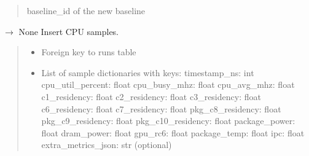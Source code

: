 \documentclass[letterpaper,10pt,english]{sphinxmanual}
\begin{document}
\begin{fulllineitems}
\begin{fulllineitems}
\begin{quote}
\begin{description}
\sphinxAtStartPar
baseline\_id of the new baseline

\end{description}\end{quote}

\end{fulllineitems}


\begin{fulllineitems}
\label{\detokenize{core.database.base:core.database.base.DatabaseInterface.insert_cpu_samples}}
\pysigstartsignatures
\pysiglinewithargsret
{}
{\sphinxparamcomma {}}
{{ $\rightarrow$ None}}
\pysigstopsignatures
\sphinxAtStartPar
Insert CPU samples.
\begin{quote}\begin{description}
\begin{itemize}
\item {} 
\sphinxAtStartPar
{} \textendash{} Foreign key to runs table

\item {} 
\sphinxAtStartPar
{} \textendash{} List of sample dictionaries with keys:
\sphinxhyphen{} timestamp\_ns: int
\sphinxhyphen{} cpu\_util\_percent: float
\sphinxhyphen{} cpu\_busy\_mhz: float
\sphinxhyphen{} cpu\_avg\_mhz: float
\sphinxhyphen{} c1\_residency: float
\sphinxhyphen{} c2\_residency: float
\sphinxhyphen{} c3\_residency: float
\sphinxhyphen{} c6\_residency: float
\sphinxhyphen{} c7\_residency: float
\sphinxhyphen{} pkg\_c8\_residency: float
\sphinxhyphen{} pkg\_c9\_residency: float
\sphinxhyphen{} pkg\_c10\_residency: float
\sphinxhyphen{} package\_power: float
\sphinxhyphen{} dram\_power: float
\sphinxhyphen{} gpu\_rc6: float
\sphinxhyphen{} package\_temp: float
\sphinxhyphen{} ipc: float
\sphinxhyphen{} extra\_metrics\_json: str (optional)

\end{itemize}


\end{description}
\end{quote}
\end{fulllineitems}
\end{fulllineitems}
\end{document}
